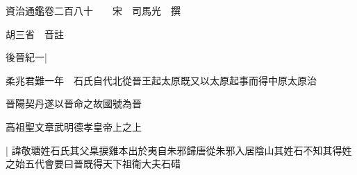 






























































資治通鑑卷二百八十　　宋　司馬光　撰

胡三省　音註

後晉紀一|{
	柔兆君難一年　石氏自代北從晉王起太原既又以太原起事而得中原太原治

晉陽契丹遂以晉命之故國號為晉}


高祖聖文章武明德孝皇帝上之上

|{
	諱敬瑭姓石氏其父臬捩雞本出於夷自朱邪歸唐從朱邪入居陰山其姓石不知其得姓之始五代會要曰晉既得天下祖衛大夫石碏}


